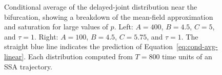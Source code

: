 \documentclass[english,letterpaper,12pt]{report}
\begin{document}
\begin{doublespacing}
\begin{figure}
    \caption{Conditional average of the delayed-joint distribution near the bifurcation, showing a breakdown of the mean-field approximation and saturation for large values of $p$. Left: $A=400$, $B=4.5$, $C=5$, and $\tau=1$. Right: $A=100$, $B=4.5$, $C=5.75$, and $\tau=1$. The straight blue line indicates the prediction of Equation~\eqref{eq:cond-avg-linear}. Each distribution computed from $T=800$ time units of an SSA trajectory.}
\end{figure}


\end{doublespacing}
\end{document}
